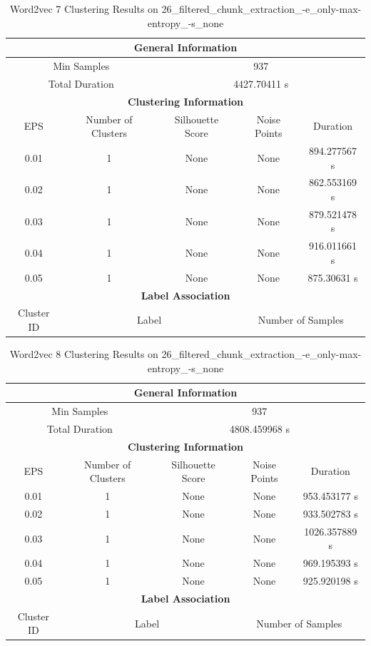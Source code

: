 \begin{longtable}{|c|c|c|c|c|}
\caption{Word2vec 7 Clustering Results on 26\_filtered\_chunk\_extraction\_-e\_only-max-entropy\_-s\_none} \label{tab:26_filtered_chunk_extraction_-e_only-max-entropy_-s_none_word2vec_7_clustering_results}\\
\hline
\multicolumn{5}{|c|}{\textbf{General Information}} \\
\hline
\multicolumn{2}{|c|}{Min Samples} & \multicolumn{3}{c|}{937} \\
\multicolumn{2}{|c|}{Total Duration} & \multicolumn{3}{c|}{4427.70411 s} \\
\hline
\multicolumn{5}{|c|}{\textbf{Clustering Information}} \\
\hline
EPS & Number of Clusters & Silhouette Score & Noise Points & Duration \\
0.01 & 1 & None & None & 894.277567 s\\
0.02 & 1 & None & None & 862.553169 s\\
0.03 & 1 & None & None & 879.521478 s\\
0.04 & 1 & None & None & 916.011661 s\\
0.05 & 1 & None & None & 875.30631 s\\
\hline
\multicolumn{5}{|c|}{\textbf{Label Association}} \\
\hline
Cluster ID & \multicolumn{2}{c|}{Label} & \multicolumn{2}{c|}{Number of Samples} \\
\hline
\end{longtable}


\begin{longtable}{|c|c|c|c|c|}
\caption{Word2vec 8 Clustering Results on 26\_filtered\_chunk\_extraction\_-e\_only-max-entropy\_-s\_none} \label{tab:26_filtered_chunk_extraction_-e_only-max-entropy_-s_none_word2vec_8_clustering_results}\\
\hline
\multicolumn{5}{|c|}{\textbf{General Information}} \\
\hline
\multicolumn{2}{|c|}{Min Samples} & \multicolumn{3}{c|}{937} \\
\multicolumn{2}{|c|}{Total Duration} & \multicolumn{3}{c|}{4808.459968 s} \\
\hline
\multicolumn{5}{|c|}{\textbf{Clustering Information}} \\
\hline
EPS & Number of Clusters & Silhouette Score & Noise Points & Duration \\
0.01 & 1 & None & None & 953.453177 s\\
0.02 & 1 & None & None & 933.502783 s\\
0.03 & 1 & None & None & 1026.357889 s\\
0.04 & 1 & None & None & 969.195393 s\\
0.05 & 1 & None & None & 925.920198 s\\
\hline
\multicolumn{5}{|c|}{\textbf{Label Association}} \\
\hline
Cluster ID & \multicolumn{2}{c|}{Label} & \multicolumn{2}{c|}{Number of Samples} \\
\hline
\end{longtable}


